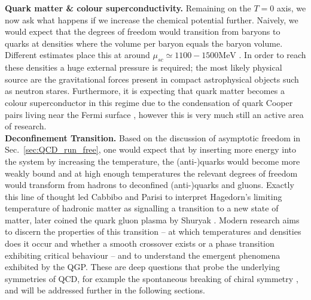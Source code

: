 \documentclass[11pt, a4paper, twoside]{book}
\begin{document}
\textbf{Quark matter \& colour superconductivity.} Remaining on the \(T=0\) axis, we now ask what happens if we increase the chemical potential further. Naively, we would expect that the degrees of freedom would transition from baryons to quarks at densities where the volume per baryon equals the baryon volume. Different estimates place this at around \(\mu_{sc}\simeq 1100-1500\mathrm{MeV}\) \cite{2001ConPh..42..209H}. In order to reach these densities a huge external pressure is required; the most likely physical source are the gravitational forces present in compact astrophysical objects such as neutron stares. Furthermore, it is expecting that quark matter becomes a colour superconductor in this regime due to the condensation of quark Cooper pairs living near the Fermi surface \cite{Alford:2001dt}, however this is very much still an active area of research. \\
\textbf{Deconfinement Transition.} Based on the discussion of asymptotic freedom in Sec.~\ref{sec:QCD_run_free}, one would expect that by inserting more energy into the system by increasing the temperature, the (anti-)quarks would become more weakly bound and at high enough temperatures the relevant degrees of freedom would transform from hadrons to deconfined (anti-)quarks and gluons. Exactly this line of thought led Cabbibo and Parisi \cite{Cabibbo:1975ig} to interpret Hagedorn's limiting temperature of hadronic matter \cite{Hagedorn:1965st} as signalling a transition to a new state of matter, later coined the quark gluon plasma by Shuryak \cite{Shuryak:1978ij}. Modern research aims to discern the properties of this transition -- at which temperatures and densities does it occur and whether a smooth crossover exists or a phase transition exhibiting critical behaviour -- and to understand the emergent phenomena exhibited by the QGP. These are deep questions that probe the underlying symmetries of QCD, for example the spontaneous breaking of chiral symmetry \cite{Martinez:2013xka}, and will be addressed further in the following sections.
\end{document}

